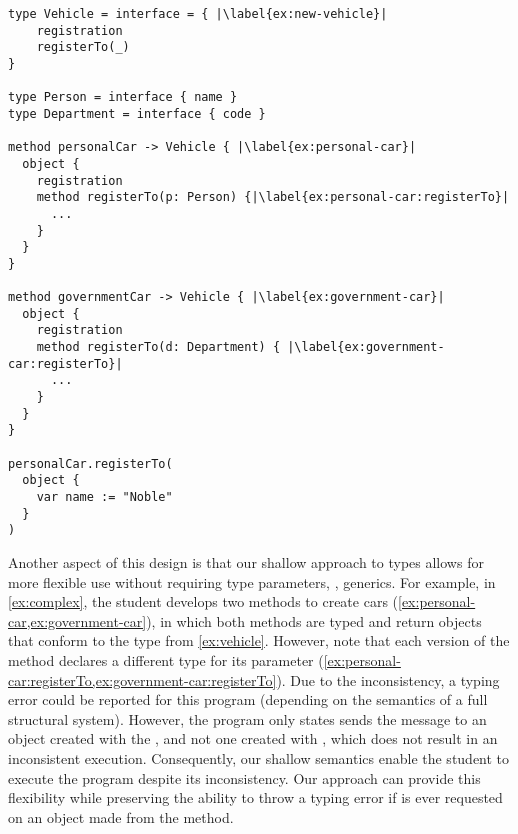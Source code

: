 \begin{lstlisting}[caption={A program in development with a well-typed execution.},escapechar=|,label={ex:complex},float,floatplacement=htb]
type Vehicle = interface = { |\label{ex:new-vehicle}|
    registration
    registerTo(_)
}

type Person = interface { name }
type Department = interface { code }

method personalCar -> Vehicle { |\label{ex:personal-car}|
  object {
    registration
    method registerTo(p: Person) {|\label{ex:personal-car:registerTo}|
      ...
    } 
  }
}

method governmentCar -> Vehicle { |\label{ex:government-car}|
  object {
    registration
    method registerTo(d: Department) { |\label{ex:government-car:registerTo}|
      ...
    }
  }
}

personalCar.registerTo(
  object {
    var name := "Noble"
  }
)
\end{lstlisting}

Another aspect of this design is
that our shallow approach to types
allows for more flexible use 
without requiring type parameters, \ie, generics.
For example, in \cref{ex:complex}, the student
develops two methods to create cars 
(\cref{ex:personal-car,ex:government-car}),
in which both methods are typed and return objects that conform to
the  type from \cref{ex:vehicle}.
However, note that each version of the  method
declares a different type for its parameter
(\cref{ex:personal-car:registerTo,ex:government-car:registerTo}).
Due to the inconsistency, a typing error could be reported
for this program (depending on the semantics of a full structural
system).
However, the program only states sends the  message to 
an object created with the ,
and not one created with ,
which does not result in an inconsistent execution. 
Consequently, our shallow semantics enable the student to execute the program
despite its inconsistency. 
Our approach can provide this flexibility while preserving the ability
to throw a typing error if  is ever requested 
on an object made from the  method.


